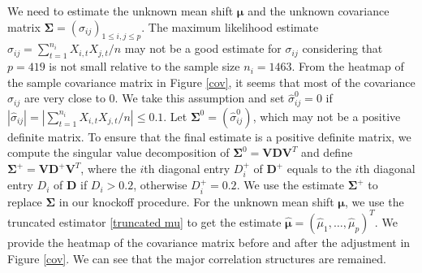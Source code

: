 \documentclass[]{interact}
\theoremstyle{plain}%
\theoremstyle{definition}
\theoremstyle{remark}
\begin{document}
We need to estimate the unknown mean shift $\bm\mu$ and the unknown covariance matrix $\bm\Sigma=(\sigma_{ij})_{1\leq i,j\leq p}$. The maximum likelihood estimate $\hat{\sigma}_{ij}=\sum_{t=1}^{n_i}X_{i,t}X_{j,t}/n$ may not be a good estimate for $\sigma_{ij}$ considering that $p=419$ is not small relative to the sample size $n_i=1463$. From the heatmap of the sample covariance matrix in Figure \ref{cov}, it seems that most of the covariance $\sigma_{ij}$ are very close to 0. We take this assumption and set $\hat{\sigma}_{ij}^0=0$ if $|\hat{\sigma}_{ij}|=|\sum_{t=1}^{n_i}X_{i,t}X_{j,t}/n|\leq 0.1$. Let $\bm\Sigma^0=(\hat{\sigma}_{ij}^0)$, which may not be a positive definite matrix. To ensure that the final estimate is a positive definite matrix, we compute the singular value decomposition of $\bm\Sigma^0=\bm V \bm D \bm V^T$ and define $\bm\Sigma^+=\bm V \bm{D}^+ \bm V^T$, where the $i$th diagonal entry $D^+_i$ of $\bm{D}^+$ equals to the $i$th diagonal entry $D_i$ of $\bm{D}$ if $D_i>0.2$, otherwise $D^+_i=0.2$. We use the estimate $\bm\Sigma^+$ to replace $\bm\Sigma$ in our knockoff procedure. For the unknown mean shift $\bm\mu$, we use the truncated estimator \eqref{truncated mu} to get the estimate $\hat{\bm\mu}=(\hat{\mu}_1,\ldots,\hat{\mu}_p)^T$. We provide the heatmap of the covariance matrix before and after the adjustment in Figure \ref{cov}. We can see that the major correlation structures are remained.
\end{document}
